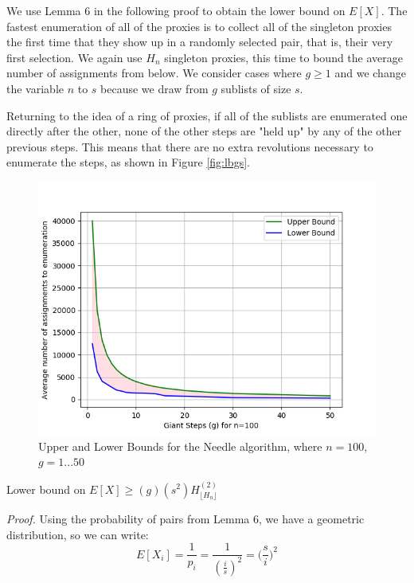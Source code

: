 We use Lemma $6$ in the following proof to obtain the lower bound on $E[X]$. The fastest enumeration of all of the proxies is to collect all of the singleton proxies the first time that they show up in a randomly selected pair, that is, their very first selection. We again use $H_n$ singleton proxies, this time to bound the average number of assignments from below. We consider cases where $g\geq1$ and we change the variable $n$ to $s$ because we draw from $g$ sublists of size $s$. 

Returning to the idea of a ring of proxies, if all of the sublists are enumerated one directly after the other, none of the other steps are "held up" by any of the other previous steps. This means that there are no extra revolutions necessary to enumerate the steps, as shown in Figure \ref{fig:lbgs}.

\begin{figure}[h!]
\centering
     \includegraphics[width=1.0\textwidth]{fig/needle_expected_value_bounds.png}
    \caption{Upper and Lower Bounds for the Needle algorithm, where $n=100$, $g=1...50$}

    \label{fig:ublb}
\end{figure}

\label{theorem:LBEX}
\begin{theorem} {Lower bound on $E[X] \geq (g) (s^2)H^{(2)}_{\lfloor{H_n}\rfloor}$}
\end{theorem}

\emph{Proof.} Using the probability of pairs from Lemma $6$, we have a geometric distribution, so we can write: $$E[X_i] = \frac{1}{p_i} = \frac{1}{(\frac{i}{s})^2} = \bigg(\frac{s}{i}\bigg)^2$$

